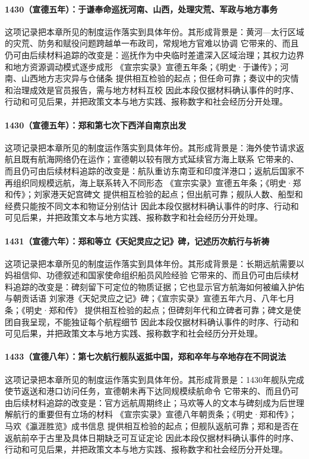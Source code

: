 \paragraph{1430（宣德五年）：于谦奉命巡抚河南、山西，处理灾荒、军政与地方事务} 这项记录把本章所见的制度运作落实到具体年份。其形成背景是：黄河—太行区域的灾荒、防务和赋役问题跨越单一布政司，常规地方官难以协调 它带来的、而且仍可由后续材料追踪的改变是：巡抚作为中央临时差遣深入区域治理；其权力边界和地方资源调动模式逐步成形 《宣宗实录》宣德五年条；《明史·于谦传》；河南、山西地方志灾异与仓储条 提供相互检验的起点；但任命可靠；奏议中的灾情和治理成效是官员报告，需与地方材料互校 因此本段仅据材料确认事件的时序、行动和可见后果，并把政策文本与地方实践、报称数字和社会经历分开处理。

\paragraph{1430（宣德五年）：郑和第七次下西洋自南京出发} 这项记录把本章所见的制度运作落实到具体年份。其形成背景是：海外使节请求返航且既有航海网络仍在运作；宣德朝以较有限方式延续官方海上联系 它带来的、而且仍可由后续材料追踪的改变是：航队重访东南亚和印度洋港口；返航后国家不再组织同规模远航，海上联系转入不同形态 《宣宗实录》宣德五年条；《明史·郑和传》；刘家港天妃宫碑文 提供相互检验的起点；但出航可靠；舰队人数、船型和经费只能按不同文本和物证分别估计 因此本段仅据材料确认事件的时序、行动和可见后果，并把政策文本与地方实践、报称数字和社会经历分开处理。

\paragraph{1431（宣德六年）：郑和等立《天妃灵应之记》碑，记述历次航行与祈祷} 这项记录把本章所见的制度运作落实到具体年份。其形成背景是：长期远航需要以妈祖信仰、功德叙述和国家使命组织船员风险经验 它带来的、而且仍可由后续材料追踪的改变是：碑刻留下可定位的物质证据；它也显示官方航海如何被编入护佑与朝贡话语 刘家港《天妃灵应之记》碑；《宣宗实录》宣德五年六月、八年七月条；《明史·郑和传》 提供相互检验的起点；但碑刻年代和立碑者可靠；碑文是使团自我呈现，不能独证每个航程细节 因此本段仅据材料确认事件的时序、行动和可见后果，并把政策文本与地方实践、报称数字和社会经历分开处理。

\paragraph{1433（宣德八年）：第七次航行舰队返抵中国，郑和卒年与卒地存在不同说法} 这项记录把本章所见的制度运作落实到具体年份。其形成背景是：1430年舰队完成使节返送和港口访问任务，宣德朝未再下达同规模续航命令 它带来的、而且仍可由后续材料追踪的改变是：官方远航周期终止；马欢等人的文本与碑刻成为后世理解航行的重要但有立场的材料 《宣宗实录》宣德八年朝贡条；《明史·郑和传》；马欢《瀛涯胜览》成书信息 提供相互检验的起点；但舰队返航可靠；郑和是否在返航前卒于古里及具体日期缺乏可互证定论 因此本段仅据材料确认事件的时序、行动和可见后果，并把政策文本与地方实践、报称数字和社会经历分开处理。


